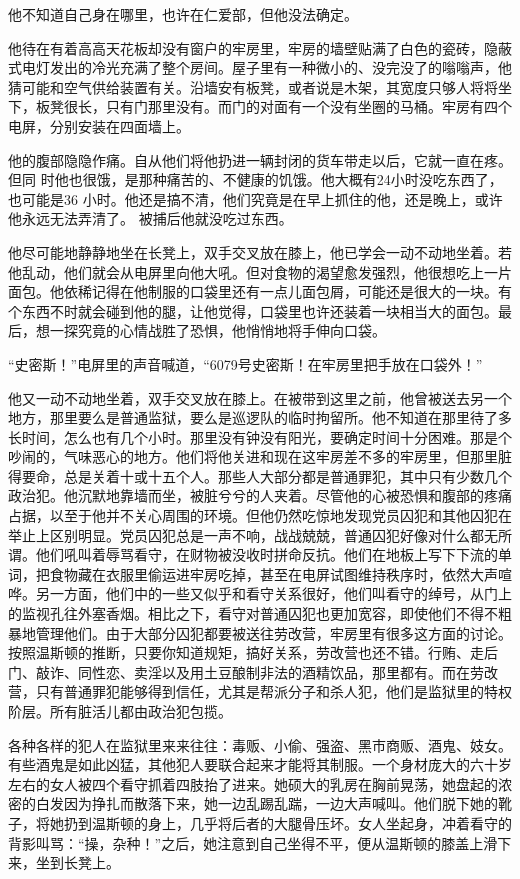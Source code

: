 他不知道自己身在哪里，也许在仁爱部，但他没法确定。

他待在有着高高天花板却没有窗户的牢房里，牢房的墙壁贴满了白色的瓷砖，隐蔽式电灯发出的冷光充满了整个房间。屋子里有一种微小的、没完没了的嗡嗡声，他猜可能和空气供给装置有关。沿墙安有板凳，或者说是木架，其宽度只够人将将坐下，板凳很长，只有门那里没有。而门的对面有一个没有坐圈的马桶。牢房有四个电屏，分别安装在四面墙上。

他的腹部隐隐作痛。自从他们将他扔进一辆封闭的货车带走以后，它就一直在疼。但同
时他也很饿，是那种痛苦的、不健康的饥饿。他大概有24小时没吃东西了，也可能是36
小时。他还是搞不清，他们究竟是在早上抓住的他，还是晚上，或许他永远无法弄清了。
被捕后他就没吃过东西。

他尽可能地静静地坐在长凳上，双手交叉放在膝上，他已学会一动不动地坐着。若他乱动，他们就会从电屏里向他大吼。但对食物的渴望愈发强烈，他很想吃上一片面包。他依稀记得在他制服的口袋里还有一点儿面包屑，可能还是很大的一块。有个东西不时就会碰到他的腿，让他觉得，口袋里也许还装着一块相当大的面包。最后，想一探究竟的心情战胜了恐惧，他悄悄地将手伸向口袋。

``史密斯！''电屏里的声音喊道，``6079号史密斯！在牢房里把手放在口袋外！''

他又一动不动地坐着，双手交叉放在膝上。在被带到这里之前，他曾被送去另一个地方，那里要么是普通监狱，要么是巡逻队的临时拘留所。他不知道在那里待了多长时间，怎么也有几个小时。那里没有钟没有阳光，要确定时间十分困难。那是个吵闹的，气味恶心的地方。他们将他关进和现在这牢房差不多的牢房里，但那里脏得要命，总是关着十或十五个人。那些人大部分都是普通罪犯，其中只有少数几个政治犯。他沉默地靠墙而坐，被脏兮兮的人夹着。尽管他的心被恐惧和腹部的疼痛占据，以至于他并不关心周围的环境。但他仍然吃惊地发现党员囚犯和其他囚犯在举止上区别明显。党员囚犯总是一声不响，战战兢兢，普通囚犯好像对什么都无所谓。他们吼叫着辱骂看守，在财物被没收时拼命反抗。他们在地板上写下下流的单词，把食物藏在衣服里偷运进牢房吃掉，甚至在电屏试图维持秩序时，依然大声喧哗。另一方面，他们中的一些又似乎和看守关系很好，他们叫看守的绰号，从门上的监视孔往外塞香烟。相比之下，看守对普通囚犯也更加宽容，即使他们不得不粗暴地管理他们。由于大部分囚犯都要被送往劳改营，牢房里有很多这方面的讨论。按照温斯顿的推断，只要你知道规矩，搞好关系，劳改营也还不错。行贿、走后门、敲诈、同性恋、卖淫以及用土豆酿制非法的酒精饮品，那里都有。而在劳改营，只有普通罪犯能够得到信任，尤其是帮派分子和杀人犯，他们是监狱里的特权阶层。所有脏活儿都由政治犯包揽。

各种各样的犯人在监狱里来来往往：毒贩、小偷、强盗、黑市商贩、酒鬼、妓女。有些酒鬼是如此凶猛，其他犯人要联合起来才能将其制服。一个身材庞大的六十岁左右的女人被四个看守抓着四肢抬了进来。她硕大的乳房在胸前晃荡，她盘起的浓密的白发因为挣扎而散落下来，她一边乱踢乱踹，一边大声喊叫。他们脱下她的靴子，将她扔到温斯顿的身上，几乎将后者的大腿骨压坏。女人坐起身，冲着看守的背影叫骂：``操，杂种！''之后，她注意到自己坐得不平，便从温斯顿的膝盖上滑下来，坐到长凳上。

